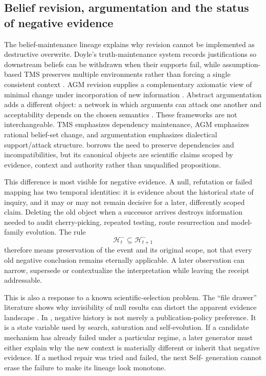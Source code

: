 \subsection{Belief revision, argumentation and the status of negative evidence}

The belief-maintenance lineage explains why revision cannot be implemented as destructive overwrite. Doyle's truth-maintenance system records justifications so downstream beliefs can be withdrawn when their supports fail, while assumption-based TMS preserves multiple environments rather than forcing a single consistent context \cite{doyle1979,dekleer1986}. AGM revision supplies a complementary axiomatic view of minimal change under incorporation of new information \cite{agm1985}. Abstract argumentation adds a different object: a network in which arguments can attack one another and acceptability depends on the chosen semantics \cite{dung1995}. These frameworks are not interchangeable. TMS emphasizes dependency maintenance, AGM emphasizes rational belief-set change, and argumentation emphasizes dialectical support/attack structure. \RAKL{} borrows the need to preserve dependencies and incompatibilities, but its canonical objects are scientific claims scoped by evidence, context and authority rather than unqualified propositions.

This difference is most visible for negative evidence. A null, refutation or failed mapping has two temporal identities: it is evidence about the historical state of inquiry, and it may or may not remain decisive for a later, differently scoped claim. Deleting the old object when a successor arrives destroys information needed to audit cherry-picking, repeated testing, route resurrection and model-family evolution. The rule
\[
\mathcal H^-_t\subseteq \mathcal H^-_{t+1}
\]
therefore means preservation of the event and its original scope, not that every old negative conclusion remains eternally applicable. A later observation can narrow, supersede or contextualize the interpretation while leaving the receipt addressable.

This is also a response to a known scientific-selection problem. The ``file drawer'' literature shows why invisibility of null results can distort the apparent evidence landscape \cite{rosenthal1979,franco2014}. In \RAKL{}, negative history is not merely a publication-policy preference. It is a state variable used by search, saturation and self-evolution. If a candidate mechanism has already failed under a particular regime, a later generator must either explain why the new context is materially different or inherit that negative evidence. If a method repair was tried and failed, the next Self-\RAKL{} generation cannot erase the failure to make its lineage look monotone.

